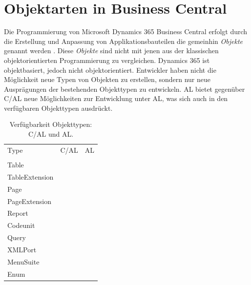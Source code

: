 %



\pagebreak
\section{Objektarten in Business Central}
\label{sec:Objektarten in Business Central}

Die Programmierung von Microsoft Dynamics 365 Business Central erfolgt durch die Erstellung und Anpassung von Applikationsbauteilen die gemeinhin \textit{Objekte} genannt werden \cite{msdnDesigningApplicationObjects}. Diese \textit{Objekte} sind nicht mit jenen aus der klassischen objektorientierten Programmierung zu vergleichen. Dynamics 365 ist objektbasiert, jedoch nicht objektorientiert. Entwickler haben nicht die Möglichkeit neue Typen von Objekten zu erstellen, sondern nur neue Ausprägungen der bestehenden Objekttypen zu entwickeln. AL bietet gegenüber C/AL neue Möglichkeiten zur Entwicklung unter AL, was sich auch in den verfügbaren Objekttypen ausdrückt.


\begin{table}[htb]
	\centering
	\begin{tabular}{lll}
		Type           & C/AL & AL \\ 
		\\
		Table          & \cmark    & \cmark  \\
		TableExtension & \xmark    & \cmark  \\
		Page           & \cmark    & \cmark  \\
		PageExtension  & \xmark    & \cmark  \\
		Report         & \cmark    & \cmark  \\
		Codeunit       & \cmark    & \cmark  \\
		Query          & \cmark    & \cmark  \\
		XMLPort        & \cmark    & \cmark  \\
		MenuSuite      & \cmark    & \xmark  \\
		Enum           & \xmark    & \cmark  \\
	\end{tabular}
\caption{Verfügbarkeit Objekttypen: C/AL und AL.}
\end{table}

